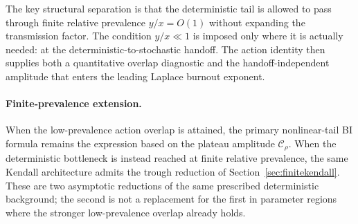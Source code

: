 \documentclass[11pt]{article}
\newcommand{\CalC}{\mathcal C_\rho}
\begin{document}
The key structural separation is that the deterministic tail is allowed to pass through finite relative prevalence $y/x=O(1)$ without expanding the transmission factor. The condition $y/x\ll1$ is imposed only where it is actually needed: at the deterministic-to-stochastic handoff. The action identity then supplies both a quantitative overlap diagnostic and the handoff-independent amplitude that enters the leading Laplace burnout exponent.


\paragraph{Finite-prevalence extension.}
When the low-prevalence action overlap is attained, the primary nonlinear-tail BI formula remains the expression based on the plateau amplitude $\CalC$.  When the deterministic bottleneck is instead reached at finite relative prevalence, the same Kendall architecture admits the trough reduction of Section~\ref{sec:finitekendall}.  These are two asymptotic reductions of the same prescribed deterministic background; the second is not a replacement for the first in parameter regions where the stronger low-prevalence overlap already holds.
\end{document}
